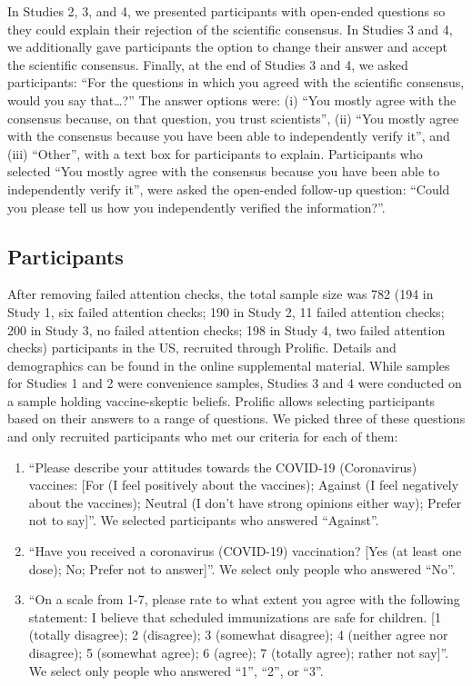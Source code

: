 \documentclass[
  doc,floatsintext]{apa6}
\providecommand{\tightlist}{%
  \setlength{\itemsep}{0pt}\setlength{\parskip}{0pt}}
\begin{document}
In Studies 2, 3, and 4, we presented participants with open-ended questions so they could explain their rejection of the scientific consensus. In Studies 3 and 4, we additionally gave participants the option to change their answer and accept the scientific consensus. Finally, at the end of Studies 3 and 4, we asked participants: ``For the questions in which you agreed with the scientific consensus, would you say that\ldots?'' The answer options were: (i) ``You mostly agree with the consensus because, on that question, you trust scientists'', (ii) ``You mostly agree with the consensus because you have been able to independently verify it'', and (iii) ``Other'', with a text box for participants to explain. Participants who selected ``You mostly agree with the consensus because you have been able to independently verify it'', were asked the open-ended follow-up question: ``Could you please tell us how you independently verified the information?''.

\subsection{Participants}\label{participants}

After removing failed attention checks, the total sample size was 782 (194 in Study 1, six failed attention checks; 190 in Study 2, 11 failed attention checks; 200 in Study 3, no failed attention checks; 198 in Study 4, two failed attention checks) participants in the US, recruited through Prolific. Details and demographics can be found in the online supplemental material. While samples for Studies 1 and 2 were convenience samples, Studies 3 and 4 were conducted on a sample holding vaccine-skeptic beliefs. Prolific allows selecting participants based on their answers to a range of questions. We picked three of these questions and only recruited participants who met our criteria for each of them:

\begin{enumerate}
\def\labelenumi{\arabic{enumi}.}
\tightlist
\item
  ``Please describe your attitudes towards the COVID-19 (Coronavirus) vaccines: {[}For (I feel positively about the vaccines); Against (I feel negatively about the vaccines); Neutral (I don't have strong opinions either way); Prefer not to say{]}''. We selected participants who answered ``Against''.
\item
  ``Have you received a coronavirus (COVID-19) vaccination? {[}Yes (at least one dose); No; Prefer not to answer{]}''. We select only people who answered ``No''.
\item
  ``On a scale from 1-7, please rate to what extent you agree with the following statement: I believe that scheduled immunizations are safe for children. {[}1 (totally disagree); 2 (disagree); 3 (somewhat disagree); 4 (neither agree nor disagree); 5 (somewhat agree); 6 (agree); 7 (totally agree); rather not say{]}''. We select only people who answered ``1'', ``2'', or ``3''.
\end{enumerate}
\end{document}
